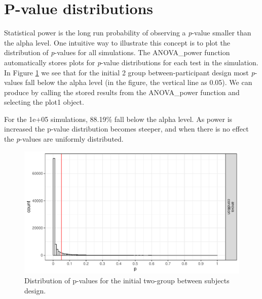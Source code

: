 \documentclass[
  ,man,floatsintext]{apa6}
\newenvironment{Shaded}{\begin{snugshade}}{\end{snugshade}}
\newcommand{\NormalTok}[1]{#1}
\newcommand{\OperatorTok}[1]{\textcolor[rgb]{0.81,0.36,0.00}{\textbf{#1}}}
\begin{document}
\hypertarget{p-value-distributions}{%
\section{P-value distributions}\label{p-value-distributions}}

Statistical power is the long run probability of observing a \emph{p}-value smaller than the alpha level.
One intuitive way to illustrate this concept is to plot the distribution of \emph{p}-values for all simulations.
The ANOVA\_power function automatically stores plots for \emph{p}-value distributions for each test in the simulation.
In Figure \ref{fig:p-plot} we see that for the initial 2 group between-participant design most \emph{p}-values fall below the alpha level (in the figure, the vertical line as 0.05). We can produce by calling the stored results from the ANOVA\_power function and selecting the plot1 object.

\begin{Shaded}
\end{Shaded}

For the 1e+05 simulations, 88.19\% fall below the alpha level.
As power is increased the p-value distribution becomes steeper, and when there is no effect the \emph{p}-values are uniformly distributed.

\begin{figure}
\centering
\includegraphics{0.1_Simulation_Based_Power_Analysis_For_Factorial_ANOVA_Designs_files/figure-latex/p-plot-1.pdf}
\caption{\label{fig:p-plot}Distribution of p-values for the initial two-group between subjects design.}
\end{figure}
\end{document}
